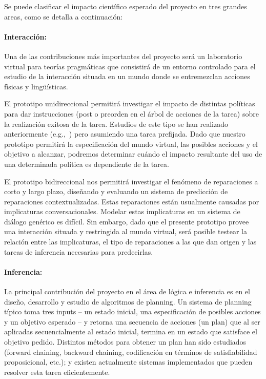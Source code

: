 
Se puede clasificar el impacto cient\'ifico
esperado del proyecto en tres grandes areas, como se detalla a continuaci\'on:

\paragraph{Interacci\'on:}
Una de las contribuciones m\'as
importantes del proyecto ser\'a un laboratorio virtual para
teor\'ias pragm\'aticas que consistir\'a de un
entorno controlado para el estudio de la interacci\'on situada en un mundo donde
se entremezclan acciones f\'isicas y ling\"u\'isticas.

El prototipo unidireccional permitir\'a
investigar el impacto de distintas
pol\'iticas para dar instrucciones (post o
preorden en el \'arbol de acciones de la tarea)
sobre la realizaci\'on exitosa de la tarea.
Estudios de este tipo se han realizado anteriormente
(e.g.,~\citep{foster-etal-ijcai2009}) pero
asumiendo una tarea prefijada.
Dado que nuestro prototipo permitir\'a la especificaci\'on
del mundo virtual, las posibles acciones y el objetivo
a alcanzar, podremos determinar cu\'ando el impacto resultante
del uso de una determinada pol\'itica
es dependiente de la tarea.

El prototipo bidireccional nos permitir\'a investigar el
fen\'omeno de reparaciones a corto y largo plazo,
dise\~nando y evaluando un sistema de predicci\'on de reparaciones
contextualizadas.  Estas reparaciones est\'an usualmente
causadas por implicaturas conversacionales.  Modelar
estas implicaturas en un sistema de di\'alogo gen\'erico
es dif\'icil.  Sin embargo, dado que el presente prototipo provee una
interacci\'on situada
y restringida al mundo virtual, ser\'a posible testear la relaci\'on entre
las implicaturas, el tipo de reparaciones a las que
dan origen y las tareas de inferencia necesarias para
predecirlas.

\paragraph{Inferencia:} La principal contribuci\'on del
proyecto en el \'area de l\'ogica e inferencia es en el
dise\~no, desarrollo y estudio de algoritmos de planning.
Un sistema de planning t\'ipico toma tres inputs -- un
estado inicial, una especificaci\'on de posibles acciones y
un objetivo esperado -- y retorna una secuencia de acciones (un plan)
que al ser aplicadas secuencialmente al estado inicial, termina
en un estado que satisface el objetivo pedido.  Distintos
m\'etodos para obtener un plan han sido estudiados (forward chaining, backward
chaining, codificaci\'on en t\'erminos de satisfiabilidad proposicional, etc.); y existen actualmente sistemas
implementados que pueden resolver esta tarea eficientemente.

